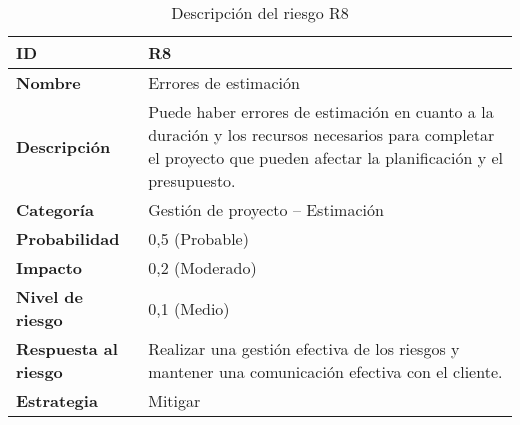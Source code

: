\begin{table}[H]
	\centering
	\begin{tabular}{|l|m{12cm}|}
		\hline
		\textbf{ID}                  & R8                                                                                                                                                                   \\
		\hline
		\textbf{Nombre}              & Errores de estimación                                                                                                                                                \\
		\hline
		\textbf{Descripción}         & Puede haber errores de estimación en cuanto a la duración y los recursos necesarios para completar el proyecto que pueden afectar la planificación y el presupuesto. \\
		\hline
		\textbf{Categoría}           & Gestión de proyecto – Estimación                                                                                                                                     \\
		\hline
		\textbf{Probabilidad}        & 0,5 (Probable)                                                                                                                                                       \\
		\hline
		\textbf{Impacto}             & 0,2 (Moderado)                                                                                                                                                       \\
		\hline
		\textbf{Nivel de riesgo}     & 0,1 (Medio)                                                                                                                                                          \\
		\hline
		\textbf{Respuesta al riesgo} & Realizar una gestión efectiva de los riesgos y mantener una comunicación efectiva con el cliente.                                                                    \\
		\hline
		\textbf{Estrategia}          & Mitigar                                                                                                                                                              \\
		\hline
	\end{tabular}
	\caption{Descripción del riesgo R8}
\end{table}

\vspace{0.5cm}

